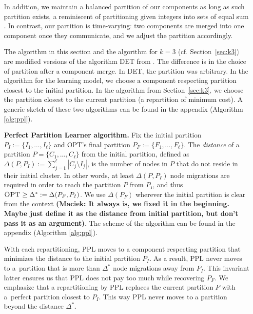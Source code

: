 \documentclass[a4paper,anonymous,USenglish]{lipics-v2019}
\newcommand{\OPT}{\textsc{OPT}\xspace}
\newcommand{\PPL}{\textsc{PPL}\xspace}
\newcommand\maciek[1]{\color{brown}\textbf{(Maciek: #1)}\color{black}}
\begin{document}
In addition,
we maintain a balanced partition of our components as long as such partition exists,
a reminiscent of partitioning given integers into sets of equal sum \cite{integer-partitions-book}.
In contrast, our partition is time-varying:  two components are merged into one component once they communicate, and we adjust the partition accordingly.




The algorithm in this section and the algorithm for $k=3$ (cf. Section~\ref{sec:k3}) are modified versions of the algorithm DET from \cite{repartition-disc}.
The difference is in the choice of partition after a component merge.
In DET, the partition was arbitrary.
In the algorithm for the learning model,
we choose a component respecting partition closest to the initial partition.
In the algorithm from Section~\ref{sec:k3}, we choose the partition closest to the current partition (a repartition of minimum cost).
A generic sketch of these two algorithms can be found in the appendix (Algorithm \ref{alg:ppl}).

\noindent
\textbf{Perfect Partition Learner algorithm.}
Fix the initial partition
$P_I :=\{ I_1, \dots, I_{\ell}\}$ and \OPT's final partition
$P_F := \{F_1, \dots, F_{\ell}\}$.
The \emph{distance} of a partition
 $P = \{C_1, \dots, C_{\ell}\}$ from the initial partition,
defined as 
$\Delta(P, P_I) := \sum_{j=1}^{\ell} | C_j \setminus I_j |$,
 is the number of nodes in $P$ that do not reside in their initial cluster.
In other words,
at least $\Delta(P, P_I)$ node migrations are required in order to reach the partition $P$ from $P_I$, and thus
$\OPT \geq \Delta^*:= \Delta(P_F, P_I) $.
We  use $ \Delta(P_F) $ wherever the initial partition is clear from the context \maciek{It always is, we fixed it in the beginning. Maybe just define it as the distance from initial partition, but don't pass it as an argument}.
The scheme of the algorithm can be found in the  appendix (Algorithm \ref{alg:ppl}).

With each repartitioning,
\PPL moves to a component respecting partition that minimizes the distance to the initial partition $P_I$.
As a result,
\PPL never moves to a~partition that is more than $\Delta^*$  node migrations away from $P_I$.
This invariant latter ensures us that \PPL does not pay too much while recovering $P_F$.
We emphasize that a repartitioning by \PPL replaces the current partition $P$ with a~perfect partition closest to $P_I$.
This way \PPL never moves to a partition beyond the distance $\Delta^*$.
\end{document}
